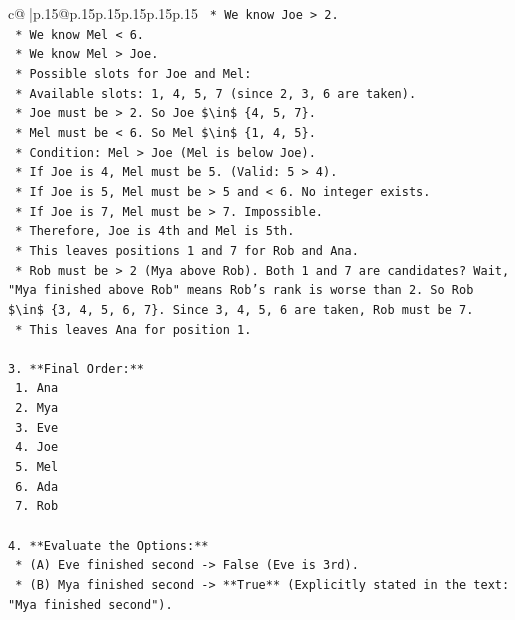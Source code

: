 \documentclass{article}
\begin{document}
{\begin{supertabular}{c@{$\;$}|p{.15\linewidth}@{}p{.15\linewidth}p{.15\linewidth}p{.15\linewidth}p{.15\linewidth}p{.15\linewidth}}
{{{\texttt{        *   We know Joe > 2.} \\
\texttt{        *   We know Mel < 6.} \\
\texttt{        *   We know Mel > Joe.} \\
\texttt{        *   Possible slots for Joe and Mel:} \\
\texttt{            *   Available slots: 1, 4, 5, 7 (since 2, 3, 6 are taken).} \\
\texttt{            *   Joe must be > 2. So Joe \$\textbackslash{}in\$ \{4, 5, 7\}.} \\
\texttt{            *   Mel must be < 6. So Mel \$\textbackslash{}in\$ \{1, 4, 5\}.} \\
\texttt{            *   Condition: Mel > Joe (Mel is below Joe).} \\
\texttt{            *   If Joe is 4, Mel must be 5. (Valid: 5 > 4).} \\
\texttt{            *   If Joe is 5, Mel must be > 5 and < 6. No integer exists.} \\
\texttt{            *   If Joe is 7, Mel must be > 7. Impossible.} \\
\texttt{            *   Therefore, Joe is 4th and Mel is 5th.} \\
\texttt{    *   This leaves positions 1 and 7 for Rob and Ana.} \\
\texttt{        *   Rob must be > 2 (Mya above Rob). Both 1 and 7 are candidates? Wait, "Mya finished above Rob" means Rob's rank is worse than 2. So Rob \$\textbackslash{}in\$ \{3, 4, 5, 6, 7\}. Since 3, 4, 5, 6 are taken, Rob must be 7.} \\
\texttt{        *   This leaves Ana for position 1.} \\
\\ 
\texttt{3.  **Final Order:**} \\
\texttt{    1.  Ana} \\
\texttt{    2.  Mya} \\
\texttt{    3.  Eve} \\
\texttt{    4.  Joe} \\
\texttt{    5.  Mel} \\
\texttt{    6.  Ada} \\
\texttt{    7.  Rob} \\
\\ 
\texttt{4.  **Evaluate the Options:**} \\
\texttt{    *   (A) Eve finished second {-}> False (Eve is 3rd).} \\
\texttt{    *   (B) Mya finished second {-}> **True** (Explicitly stated in the text: "Mya finished second").} \\
}}}
\end{supertabular}}
\end{document}
